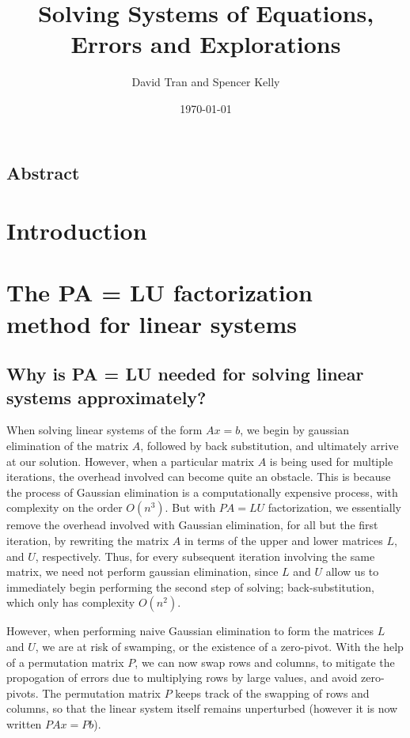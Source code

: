 \documentclass[11pt]{article}
\title{Solving Systems of Equations, Errors and Explorations}
\author{David Tran and Spencer Kelly}
\date{\today}
\begin{document}
\maketitle

\subsection*{Abstract}

\section{Introduction}

\section{The PA = LU factorization method for linear systems}

\subsection{Why is PA = LU needed for solving linear systems approximately?}

When solving linear systems of the form $Ax = b$, we begin by gaussian elimination of the matrix $A$, followed by back substitution, and ultimately arrive at our solution.
However, when a particular matrix $A$ is being used for multiple iterations, the overhead involved can become quite an obstacle.
This is because the process of Gaussian elimination is a computationally expensive process, with complexity on the order $O(n^3)$.
But with $PA = LU$ factorization, we essentially remove the overhead involved with Gaussian elimination, for all but the first iteration, by rewriting the matrix $A$ in terms of the upper and lower matrices $L$, and $U$, respectively.
Thus, for every subsequent iteration involving the same matrix, we need not perform gaussian elimination, since $L$ and $U$ allow us to immediately begin performing the second step of solving;
back-substitution, which only has complexity $O(n^2)$.

However, when performing naive Gaussian elimination to form the matrices $L$ and $U$, we are at risk of swamping, or the existence of a zero-pivot.
With the help of a permutation matrix $P$, we can now swap rows and columns, to mitigate the propogation of errors due to multiplying rows by large values, and avoid zero-pivots.
The permutation matrix $P$ keeps track of the swapping of rows and columns, so that the linear system itself remains unperturbed (however it is now written $PAx = Pb$).
\end{document}
